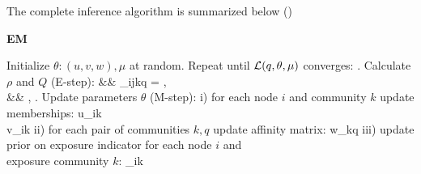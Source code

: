 \newpage
The complete inference algorithm is summarized below ()
\setlength{\textfloatsep}{5pt}
\begin{algorithm}[H]
 	\caption{\textbf{EM}}
	\label{alg:EM}
	\raggedright
    \BlankLine
  	\BlankLine
	\BlankLine
	 Initialize $\theta:(u,v,w), \mu$ at random. 
	 \BlankLine
	 Repeat until $\mathcal{L}(q, \theta, \mu)$ converges:
	 \BlankLine
	. Calculate $\rho$ and $Q$ (E-step): 
	\bea
	 && \rho_{ijkq} =  \;,\quad \nonumber \\ 
     &&  \Qijt {}, \nonumber 
    \nonumber
	\eea
    \BlankLine
	. Update parameters $\theta$ (M-step):  
	\BlankLine
	\quad \quad \quad \quad 
		i) for each node $i$ and community $k$ update memberships:
		\bea
		\quad  {} u_{ik}    \nonumber\\
	    \quad {} v_{ik}   \nonumber
		\eea
	\quad \quad \quad \quad
	ii) for each pair of communities $k,q$ update affinity matrix:
		\be
		\quad {} w_{kq}    \nonumber
        \nonumber
		\ee
	\quad \quad \quad \quad
		iii) update prior on exposure indicator for each node $i$ and \\
             \hspace{2.4cm} exposure community $k$:
		\be \label{eqn:mu}
		 \mu_{ik}    \nonumber
        \nonumber
		\ee
		\quad \quad \quad

\end{algorithm}